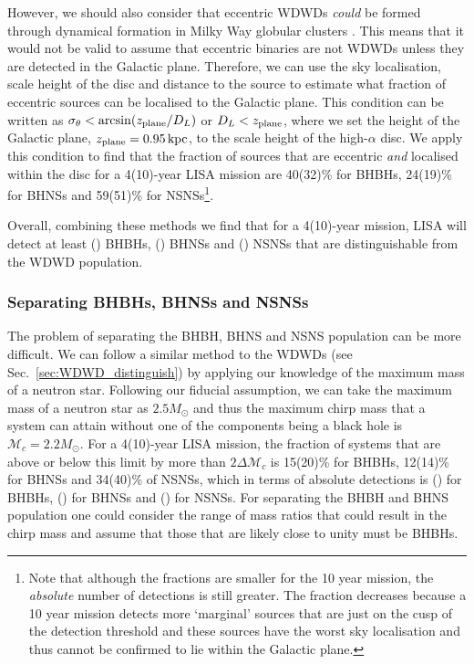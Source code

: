 However, we should also consider that eccentric WDWDs \textit{could} be formed through dynamical formation in Milky Way globular clusters \citep[e.g.][]{Willems+2007, Kremer+2018}. This means that it would not be valid to assume that eccentric binaries are not WDWDs unless they are detected in the Galactic plane. Therefore, we can use the sky localisation, scale height of the disc and distance to the source to estimate what fraction of eccentric sources can be localised to the Galactic plane. This condition can be written as $\sigma_\theta < \arcsin(z_{\rm plane} / D_L)$ or $D_L < z_{\rm plane}$, where we set the height of the Galactic plane, $z_{\rm plane}=0.95 \unit{kpc}$, to the scale height of the high-$\alpha$ disc. We apply this condition to find that the fraction of sources that are eccentric \textit{and} localised within the disc for a 4(10)-year LISA mission are 40(32)\% for BHBHs, 24(19)\% for BHNSs and 59(51)\% for NSNSs\footnote{Note that although the fractions are smaller for the 10 year mission, the \textit{absolute} number of detections is still greater. The fraction decreases because a 10 year mission detects more `marginal' sources that are just on the cusp of the detection threshold and these sources have the worst sky localisation and thus cannot be confirmed to lie within the Galactic plane.}.

Overall, combining these methods we find that for a 4(10)-year mission, LISA will detect at least \BHBHNotWDWDFour{}(\BHBHNotWDWDTen{}) BHBHs, \BHNSNotWDWDFour{}(\BHNSNotWDWDTen{}) BHNSs and \NSNSNotWDWDFour{}(\NSNSNotWDWDTen{}) NSNSs that are distinguishable from the WDWD population.

\subsubsection{Separating BHBHs, BHNSs and NSNSs}

The problem of separating the BHBH, BHNS and NSNS population can be more difficult. We can follow a similar method to the WDWDs (see Sec.~\ref{sec:WDWD_distinguish}) by applying our knowledge of the maximum mass of a neutron star. Following our fiducial assumption, we can take the maximum mass of a neutron star as $2.5 \unit{M_{\odot}}$ and thus the maximum chirp mass that a system can attain without one of the components being a black hole is $\mathcal{M}_{c} = 2.2 \unit{M_\odot}$. For a 4(10)-year LISA mission, the fraction of systems that are above or below this limit by more than $2 \Delta \mathcal{M}_c$ is 15(20)\% for BHBHs, 12(14)\% for BHNSs and 34(40)\% of NSNSs, which in terms of absolute detections is \BHBHDistinguishedFour{}(\BHBHDistinguishedTen{}) for BHBHs, \BHNSDistinguishedFour{}(\BHNSDistinguishedTen{}) for BHNSs and \NSNSDistinguishedFour{}(\NSNSDistinguishedTen{}) for NSNSs. For separating the BHBH and BHNS population one could consider the range of mass ratios that could result in the chirp mass and assume that those that are likely close to unity must be BHBHs.

